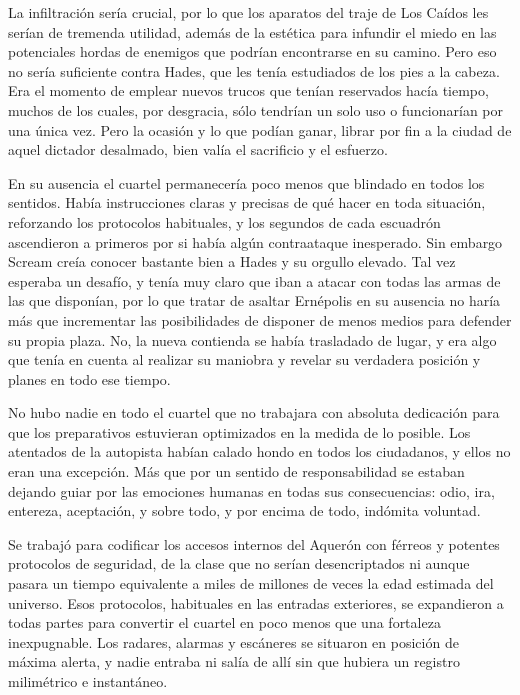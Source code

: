 La infiltración sería crucial, por lo que los aparatos del traje de Los Caídos les serían de tremenda utilidad, además de la estética para infundir el miedo en las potenciales hordas de enemigos que podrían encontrarse en su camino. Pero eso no sería suficiente contra Hades, que les tenía estudiados de los pies a la cabeza. Era el momento de emplear nuevos trucos que tenían reservados hacía tiempo, muchos de los cuales, por desgracia, sólo tendrían un solo uso o funcionarían por una única vez. Pero la ocasión y lo que podían ganar, librar por fin a la ciudad de aquel dictador desalmado, bien valía el sacrificio y el esfuerzo.

En su ausencia el cuartel permanecería poco menos que blindado en todos los sentidos. Había instrucciones claras y precisas de qué hacer en toda situación, reforzando los protocolos habituales, y los segundos de cada escuadrón ascendieron a primeros por si había algún contraataque inesperado. Sin embargo Scream creía conocer bastante bien a Hades y su orgullo elevado. Tal vez esperaba un desafío, y tenía muy claro que iban a atacar con todas las armas de las que disponían, por lo que tratar de asaltar Ernépolis en su ausencia no haría más que incrementar las posibilidades de disponer de menos medios para defender su propia plaza. No, la nueva contienda se había trasladado de lugar, y era algo que tenía en cuenta al realizar su maniobra y revelar su verdadera posición y planes en todo ese tiempo.

No hubo nadie en todo el cuartel que no trabajara con absoluta dedicación para que los preparativos estuvieran optimizados en la medida de lo posible. Los atentados de la autopista habían calado hondo en todos los ciudadanos, y ellos no eran una excepción. Más que por un sentido de responsabilidad se estaban dejando guiar por las emociones humanas en todas sus consecuencias: odio, ira, entereza, aceptación, y sobre todo, y por encima de todo, indómita voluntad.

Se trabajó para codificar los accesos internos del Aquerón con férreos y potentes protocolos de seguridad, de la clase que no serían desencriptados ni aunque pasara un tiempo equivalente a miles de millones de veces la edad estimada del universo. Esos protocolos, habituales en las entradas exteriores, se expandieron a todas partes para convertir el cuartel en poco menos que una fortaleza inexpugnable. Los radares, alarmas y escáneres se situaron en posición de máxima alerta, y nadie entraba ni salía de allí sin que hubiera un registro milimétrico e instantáneo.

